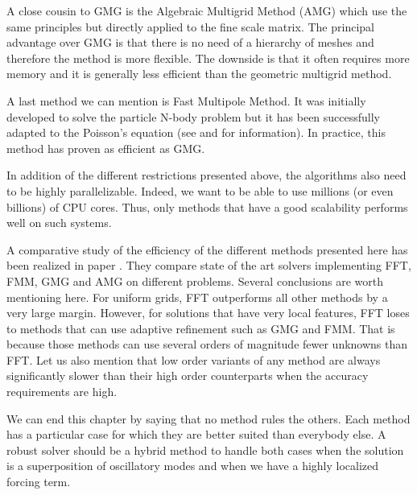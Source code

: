 A close cousin to GMG is the Algebraic Multigrid Method (AMG) which use the same principles but directly applied to the fine scale matrix. The principal advantage over GMG is that there is no need of a hierarchy of meshes and therefore the method is more flexible. The downside is that it often requires more memory and it is generally less efficient than the geometric multigrid method. 

A last method we can mention is Fast Multipole Method. It was initially developed to solve the particle N-body problem but it has been successfully adapted to the Poisson's equation (see \cite{fmm1} and \cite{fmm2} for information). In practice, this method has proven as efficient as GMG.

In addition of the different restrictions presented above, the algorithms also need to be highly parallelizable. Indeed, we want to be able to use millions (or even billions) of CPU cores. Thus, only methods that have a good scalability performs well on such systems.

A comparative study of the efficiency of the different methods presented here has been realized in paper \cite{compa}. They compare state of the art solvers implementing FFT, FMM, GMG and AMG on different problems. Several conclusions are worth mentioning here. For uniform grids, FFT outperforms all other methods by a very large margin. However, for solutions that have very local features, FFT loses to methods that can use adaptive refinement such as GMG and FMM. That is because those methods can use several orders of magnitude fewer unknowns than FFT. Let us also mention that low order variants of any method are always significantly slower than their high order counterparts when the accuracy requirements are high.  

We can end this chapter by saying that no method rules the others. Each method has a particular case for which they are better suited than everybody else. A robust solver should be a hybrid method to handle both cases when the solution is a superposition of oscillatory modes and when we have a highly localized forcing term.



 

